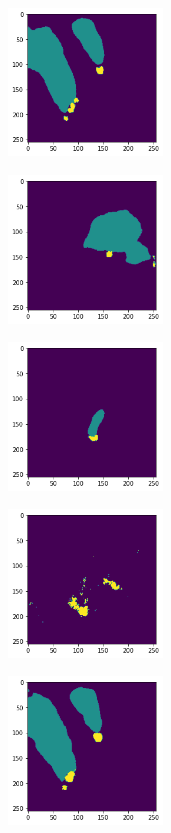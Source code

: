 \begin{figure}[ht]
\begin{subfigure}{.24\linewidth}
        \includegraphics[width = 41mm]{figs/aunet1.png}
    \end{subfigure}
    \begin{subfigure}{.24\linewidth}
    \centering
        \includegraphics[width = 41mm]{figs/aunet2.png}
    \end{subfigure}
        \begin{subfigure}{.24\linewidth}
    \centering
        \includegraphics[width = 41mm]{figs/aunet3.png}
    \end{subfigure}
    \begin{subfigure}{.24\linewidth}
    \centering
        \includegraphics[width = 41mm]{figs/aunet4.png}
    \end{subfigure}
        \begin{subfigure}{.24\linewidth}
    \centering
        \includegraphics[width = 41mm]{figs/atunet1.png}

\end{subfigure}
\end{figure}

